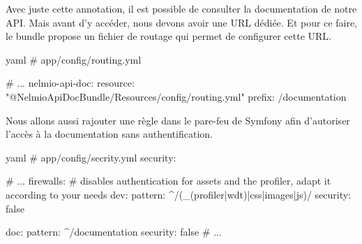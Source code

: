 \documentclass[big]{zmdocument}
\begin{document}



Avec juste cette annotation, il est possible de consulter la documentation de notre API. Mais avant d'y accéder, nous devons avoir une URL dédiée. Et pour ce faire, le bundle propose un fichier de routage qui permet de configurer cette URL.



\begin{CodeBlock}{yaml}
# app/config/routing.yml

# ...
nelmio-api-doc:
    resource: "@NelmioApiDocBundle/Resources/config/routing.yml"
    prefix:   /documentation
\end{CodeBlock}



Nous allons aussi rajouter une règle dans le pare-feu de Symfony afin d'autoriser l'accès à la documentation sans authentification.



\begin{CodeBlock}{yaml}
# app/config/secrity.yml
security:

# ...
    firewalls:
        # disables authentication for assets and the profiler, adapt it according to your needs
        dev:
            pattern: ^/(_(profiler|wdt)|css|images|js)/
            security: false

        doc:
            pattern: ^/documentation
            security: false
# ...
\end{CodeBlock}
\end{document}
